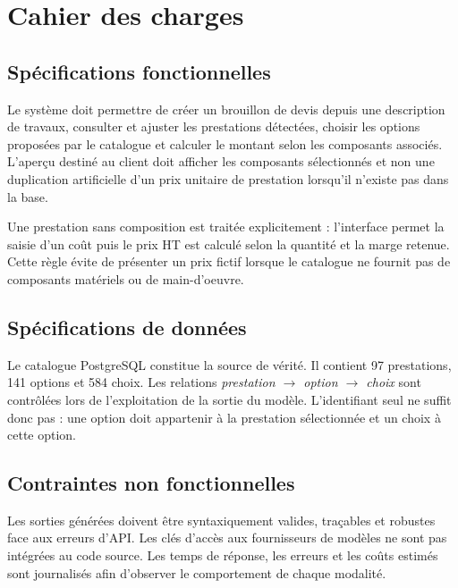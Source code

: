 \section{Cahier des charges}
\subsection{Spécifications fonctionnelles}
Le système doit permettre de créer un brouillon de devis depuis une description de travaux, consulter et ajuster les prestations détectées, choisir les options proposées par le catalogue et calculer le montant selon les composants associés. L'aperçu destiné au client doit afficher les composants sélectionnés et non une duplication artificielle d'un prix unitaire de prestation lorsqu'il n'existe pas dans la base.

Une prestation sans composition est traitée explicitement : l'interface permet la saisie d'un coût puis le prix HT est calculé selon la quantité et la marge retenue. Cette règle évite de présenter un prix fictif lorsque le catalogue ne fournit pas de composants matériels ou de main-d'oeuvre.

\subsection{Spécifications de données}
Le catalogue PostgreSQL constitue la source de vérité. Il contient 97 prestations, 141 options et 584 choix. Les relations \textit{prestation $\rightarrow$ option $\rightarrow$ choix} sont contrôlées lors de l'exploitation de la sortie du modèle. L'identifiant seul ne suffit donc pas : une option doit appartenir à la prestation sélectionnée et un choix à cette option.

\subsection{Contraintes non fonctionnelles}
Les sorties générées doivent être syntaxiquement valides, traçables et robustes face aux erreurs d'API. Les clés d'accès aux fournisseurs de modèles ne sont pas intégrées au code source. Les temps de réponse, les erreurs et les coûts estimés sont journalisés afin d'observer le comportement de chaque modalité.
